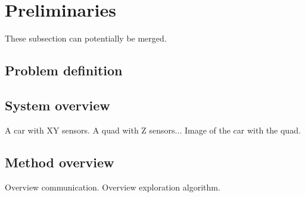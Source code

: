 
\section{Preliminaries}

These subsection can potentially be merged.

\subsection{Problem definition}


\subsection{System overview}
A car with XY sensors. A quad with Z sensors...
Image of the car with the quad.

\subsection{Method overview}
Overview communication.
Overview exploration algorithm.